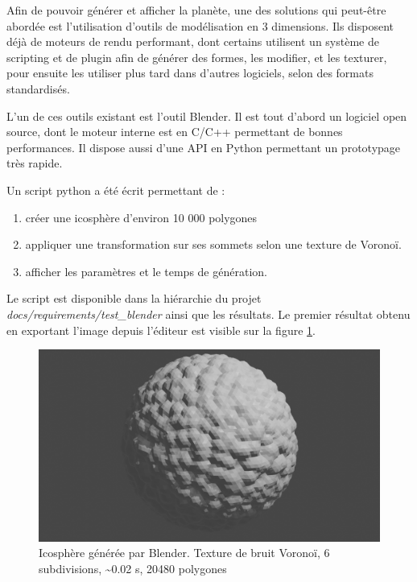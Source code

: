 \documentclass[a4paper]{article}
\begin{document}
Afin de pouvoir générer et afficher la planète, une des solutions qui peut-être abordée est l'utilisation d'outils de modélisation en 3 dimensions. Ils disposent déjà de moteurs de rendu performant, dont certains utilisent un système de scripting et de plugin afin de générer des formes, les modifier, et les texturer, pour ensuite les utiliser plus tard dans d'autres logiciels, selon des formats standardisés.

L'un de ces outils existant est l'outil Blender. Il est tout d'abord un logiciel open source, dont le moteur interne est en C/C++ permettant de bonnes performances. Il dispose aussi d'une API en Python permettant un prototypage très rapide.

Un script python a été écrit permettant de :
\begin{enumerate}
            \item {créer une icosphère d'environ 10 000 polygones}
            \item {appliquer une transformation sur ses sommets selon une texture de Voronoï.}
            \item {afficher les paramètres et le temps de génération.}
\end{enumerate}

Le script est disponible dans la hiérarchie du projet \textit{docs/requirements/test\_blender} ainsi que les résultats. Le premier résultat obtenu en exportant l'image depuis l'éditeur est visible sur la figure \ref{blendericos}.\\

\begin{figure}[!h]
\begin{center} \includegraphics[width=0.8\linewidth]{img/blender/blender_1.png} \end{center}
\caption{\label{blendericos}Icosphère générée par Blender. Texture de bruit Voronoï, 6 subdivisions, \textasciitilde0.02 s, 20480 polygones}
\end{figure}
\end{document}

